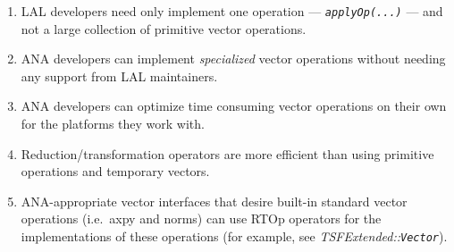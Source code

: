 \begin{enumerate}
\item
LAL developers need only implement one operation ---
{}\textit{\texttt{applyOp(\-...)}} --- and not a large collection of
primitive vector operations.
\item
ANA developers can implement {}\textit{specialized} vector operations
without needing any support from LAL maintainers.
\item
ANA developers can optimize time consuming vector operations on their
own for the platforms they work with.
\item
Reduction/transformation operators are more efficient than using
primitive operations and temporary vectors.
\item
ANA-appropriate vector interfaces that desire built-in standard vector
operations (i.e.~axpy and norms) can use RTOp operators for the
implementations of these operations (for example, see
{}\textit{TSFExtended\-::\texttt{Vector}}).
\end{enumerate}

